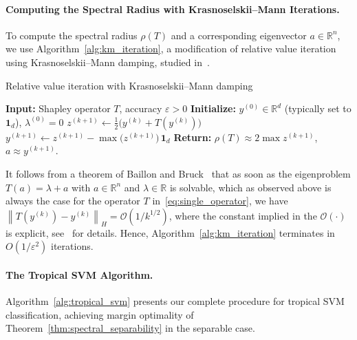 \documentclass{article}
\renewcommand{\leq}{\leqslant}
\newcommand{\R}{\mathbb{R}}
\begin{document}
\paragraph{Computing the Spectral Radius with Krasnoselskii--Mann Iterations.}
\label{subsec:spectral_computation}
To compute the spectral radius $\rho(T)$ and a corresponding eigenvector $a\in \R^n$, we use
Algorithm~\ref{alg:km_iteration}, a modification of relative value
iteration using Krasnoselskii--Mann damping, studied
in~\cite{akianmfcs}.
\begin{algorithm}
\caption{Relative value iteration with Krasnoselskii--Mann damping~\cite{akianmfcs}}\label{alg:km_iteration}
\begin{algorithmic}[1]
\STATE \textbf{Input:} Shapley operator $T$, accuracy $\varepsilon > 0$
\STATE \textbf{Initialize:} $y^{(0)} \in \R^d$ (typically set to $\mathbf{1}_d$), $\lambda^{(0)} = 0$
\REPEAT
  \STATE $z^{(k+1)} \leftarrow \frac{1}{2}\bigl(y^{(k)} + T(y^{(k)})\bigr)$
  \STATE $y^{(k+1)} \leftarrow z^{(k+1)} - \max\bigl(z^{(k+1)}\bigr)\,\mathbf{1}_d$ 
  \UNTIL{$\left\|T(y^{(k)})-y^{(k)}\right\|_H\leq \varepsilon$}
  \STATE \textbf{Return:} $\rho(T) \approx 2\max z^{(k+1)}$,
  $a \approx y^{(k+1)}$.
\end{algorithmic}
\end{algorithm}
It follows from a theorem of Baillon and Bruck~\cite{baillonbruck} that
as soon as the eigenproblem $T(a)=\lambda + a$ with $a\in \R^n$ and $\lambda \in \R$ is solvable, which as observed above is always the case for the operator $T$ in~\eqref{eq:single_operator},
we have
$\left\|T(y^{(k)})-y^{(k)}\right\|_H
= \mathcal{O}(1/k^{1/2})$, where the constant implied in the $\mathcal{O}(\cdot)$ is explicit, 
see~\cite{akianmfcs} for details. 
Hence, Algorithm~\ref{alg:km_iteration} terminates in $O(1/\varepsilon^2)$ iterations.

\paragraph{The Tropical SVM Algorithm.}\label{subsec:complete_algorithm}
Algorithm~\ref{alg:tropical_svm} presents our complete procedure for tropical SVM classification, achieving margin optimality of Theorem~\ref{thm:spectral_separability} in the separable case.
\end{document}
